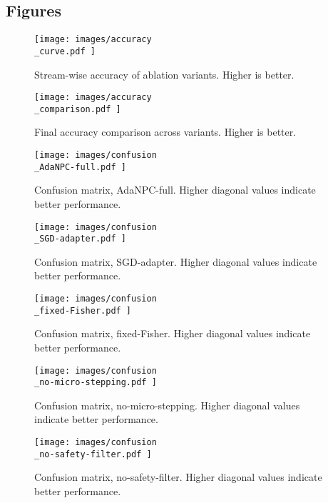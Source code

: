 \documentclass{article} %
\begin{document}
\subsection{Figures}
\begin{figure}[H]
  \centering
  \texttt{[image:  images/accuracy\\\_curve.pdf ]}
  \caption{Stream-wise accuracy of ablation variants. Higher is better.}
\end{figure}
\begin{figure}[H]
  \centering
  \texttt{[image:  images/accuracy\\\_comparison.pdf ]}
  \caption{Final accuracy comparison across variants. Higher is better.}
\end{figure}
\begin{figure}[H]
  \centering
  \texttt{[image:  images/confusion\\\_AdaNPC-full.pdf ]}
  \caption{Confusion matrix, AdaNPC-full. Higher diagonal values indicate better performance.}
\end{figure}
\begin{figure}[H]
  \centering
  \texttt{[image:  images/confusion\\\_SGD-adapter.pdf ]}
  \caption{Confusion matrix, SGD-adapter. Higher diagonal values indicate better performance.}
\end{figure}
\begin{figure}[H]
  \centering
  \texttt{[image:  images/confusion\\\_fixed-Fisher.pdf ]}
  \caption{Confusion matrix, fixed-Fisher. Higher diagonal values indicate better performance.}
\end{figure}
\begin{figure}[H]
  \centering
  \texttt{[image:  images/confusion\\\_no-micro-stepping.pdf ]}
  \caption{Confusion matrix, no-micro-stepping. Higher diagonal values indicate better performance.}
\end{figure}
\begin{figure}[H]
  \centering
  \texttt{[image:  images/confusion\\\_no-safety-filter.pdf ]}
  \caption{Confusion matrix, no-safety-filter. Higher diagonal values indicate better performance.}
\end{figure}
\end{document}
